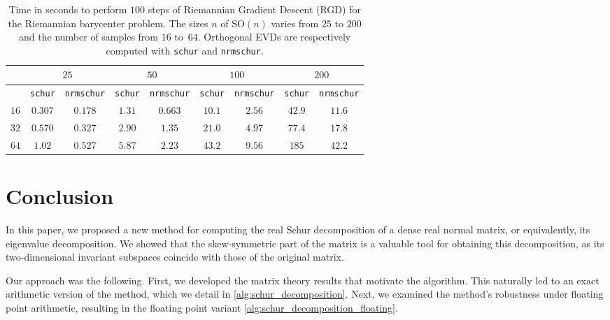 \documentclass[10pt,twoside,dvipsnames]{siamart1116}
\numberwithin{algorithm}{section}
\numberwithin{equation}{section}
\begin{document}
	 \begin{table}[ht]
	 \centering
	 \begin{tabular}{||c||c c||c c||c c||c c||}
	 \hline
	  \diagbox[dir=SE]{$N$}{$n$}&\multicolumn{2}{c||}{$25$}&\multicolumn{2}{c||}{$50$}&\multicolumn{2}{c||}{$100$}&\multicolumn{2}{c||}{$200$}\\
	  \hline
	  & \texttt{schur}&\texttt{nrmschur}& \texttt{schur}&\texttt{nrmschur}& \texttt{schur}&\texttt{nrmschur}&\texttt{schur}&\texttt{nrmschur}\\
	 \hline
	  $16$& $0.307$&$ 0.178$ &  $1.31$& $0.663$& $10.1 $&$ 2.56$& $42.9$&$11.6$ \\
	  $32$&$0.570$&$0.327$&$  2.90$&$1.35$& $ 21.0$&$4.97$&$  77.4$&$17.8 $ \\
	 $64$&$1.02$&$0.527$ & $ 5.87$&$ 2.23$&$ 43.2$&$9.56$&$ 185$&$42.2$ \\
	 \hline
	 \end{tabular}
	 \caption{\justifying Time in seconds to perform $100$ steps of Riemannian Gradient Descent (RGD) for the Riemannian barycenter problem. The sizes $n$ of $\mathrm{SO}(n)$ varies from $25$ to $200$ and the number of samples from $16$ to~$64$. Orthogonal EVDs are respectively computed with \texttt{schur} and \texttt{nrmschur}.}
	 \label{tab:karcher}
	 \vspace*{-0.7cm}
	 \end{table}
	 
	 \section{Conclusion} In this paper, we proposed a new method for computing the real Schur decomposition of a dense real normal matrix, or equivalently, its eigenvalue decomposition. We showed that the skew-symmetric part of the matrix is a valuable tool for obtaining this decomposition, as its two-dimensional invariant subspaces coincide with those of the original matrix.

Our approach was the following. First, we developed the matrix theory results that motivate the algorithm. This naturally led to an exact arithmetic version of the method, which we detail in \cref{alg:schur_decomposition}. Next, we examined the method’s robustness under floating point arithmetic, resulting in the floating point variant \cref{alg:schur_decomposition_floating}.
\end{document}

